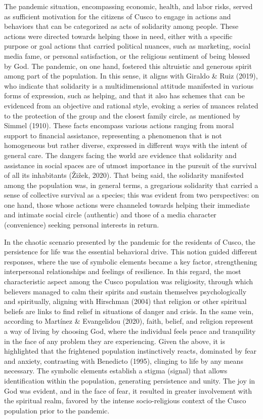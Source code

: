 \documentclass{article}
\begin{document}
The pandemic situation, encompassing economic, health, and labor risks, served as sufficient motivation for the citizens of Cusco to engage in actions and behaviors that can be categorized as acts of solidarity among people. These actions were directed towards helping those in need, either with a specific purpose or goal actions that carried political nuances, such as marketing, social media fame, or personal satisfaction, or the religious sentiment of being blessed by God. The pandemic, on one hand, fostered this altruistic and generous spirit among part of the population. In this sense, it aligns with Giraldo \& Ruiz (2019), who indicate that solidarity is a multidimensional attitude manifested in various forms of expression, such as helping, and that it also has schemes that can be evidenced from an objective and rational style, evoking a series of nuances related to the protection of the group and the closest family circle, as mentioned by Simmel (1910). These facts encompass various actions ranging from moral support to financial assistance, representing a phenomenon that is not homogeneous but rather diverse, expressed in different ways with the intent of general care. The dangers facing the world are evidence that solidarity and assistance in social spaces are of utmost importance in the pursuit of the survival of all its inhabitants (Žižek, 2020). That being said, the solidarity manifested among the population was, in general terms, a gregarious solidarity that carried a sense of collective survival as a species; this was evident from two perspectives: on one hand, those whose actions were channeled towards helping their immediate and intimate social circle (authentic) and those of a media character (convenience) seeking personal interests in return.

In the chaotic scenario presented by the pandemic for the residents of Cusco, the persistence for life was the essential behavioral drive. This notion guided different responses, where the use of symbolic elements became a key factor, strengthening interpersonal relationships and feelings of resilience. In this regard, the most characteristic aspect among the Cusco population was religiosity, through which believers managed to calm their spirits and sustain themselves psychologically and spiritually, aligning with Hirschman (2004) that religion or other spiritual beliefs are links to find relief in situations of danger and crisis. In the same vein, according to Martínez \& Evangelidou (2020), faith, belief, and religion represent a way of living by choosing God, where the individual feels peace and tranquility in the face of any problem they are experiencing. Given the above, it is highlighted that the frightened population instinctively reacts, dominated by fear and anxiety, contrasting with Benedicto (1995), clinging to life by any means necessary. The symbolic elements establish a stigma (signal) that allows identification within the population, generating persistence and unity. The joy in God was evident, and in the face of fear, it resulted in greater involvement with the spiritual realm, favored by the intense socio-religious context of the Cusco population prior to the pandemic.
\end{document}
